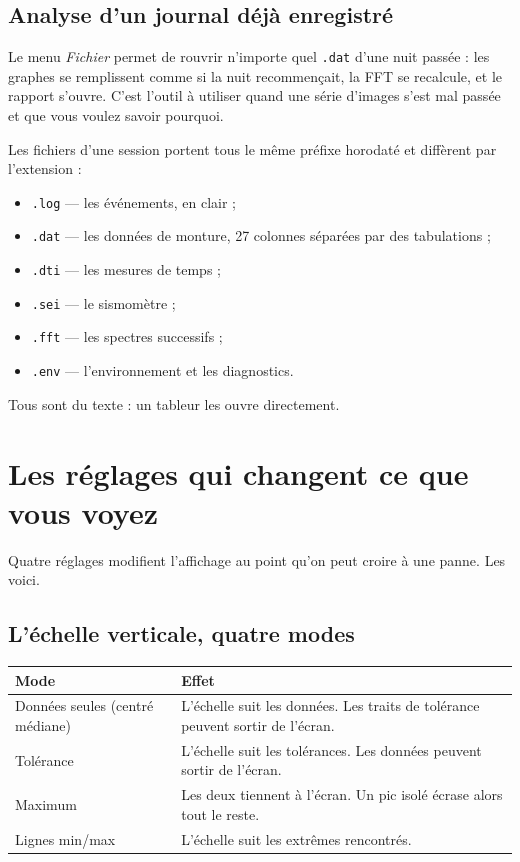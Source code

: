 \documentclass[a4paper,11pt,twoside]{report}
\begin{document}
\section{Analyse d'un journal déjà enregistré}

Le menu \emph{Fichier} permet de rouvrir n'importe quel \texttt{.dat} d'une
nuit passée : les graphes se remplissent comme si la nuit recommençait, la
FFT se recalcule, et le rapport s'ouvre. C'est l'outil à utiliser quand une
série d'images s'est mal passée et que vous voulez savoir pourquoi.

\begin{prepa}
Les fichiers d'une session portent tous le même préfixe horodaté et
diffèrent par l'extension :
\begin{itemize}[nosep]
  \item \texttt{.log} --- les événements, en clair ;
  \item \texttt{.dat} --- les données de monture, 27 colonnes séparées par des
  tabulations ;
  \item \texttt{.dti} --- les mesures de temps ;
  \item \texttt{.sei} --- le sismomètre ;
  \item \texttt{.fft} --- les spectres successifs ;
  \item \texttt{.env} --- l'environnement et les diagnostics.
\end{itemize}
Tous sont du texte : un tableur les ouvre directement.
\end{prepa}

\chapter{Les réglages qui changent ce que vous voyez}

Quatre réglages modifient l'affichage au point qu'on peut croire à une panne.
Les voici.

\section{L'échelle verticale, quatre modes}

\begin{center}
\begin{tabularx}{\textwidth}{lX}
\toprule
\textbf{Mode} & \textbf{Effet} \\
\midrule
Données seules (centré médiane) & L'échelle suit les données. Les traits de
tolérance peuvent sortir de l'écran. \\
Tolérance & L'échelle suit les tolérances. Les données peuvent sortir de
l'écran. \\
Maximum & Les deux tiennent à l'écran. Un pic isolé écrase alors tout le
reste. \\
Lignes min/max & L'échelle suit les extrêmes rencontrés. \\
\bottomrule
\end{tabularx}
\end{center}
\end{document}
